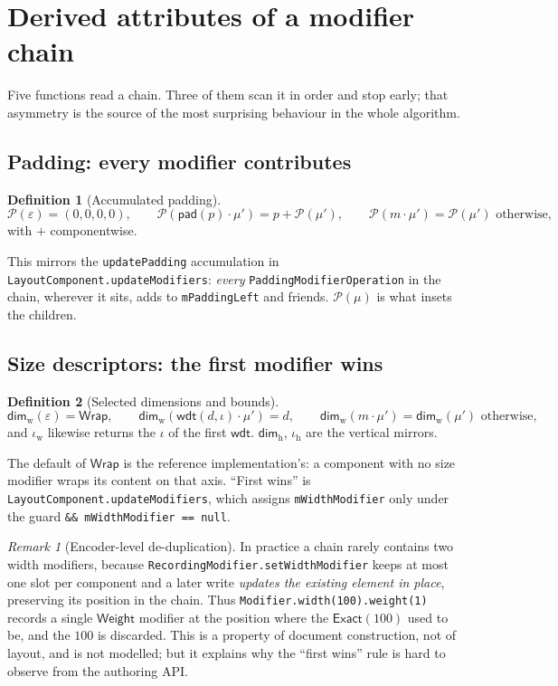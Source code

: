 \documentclass[11pt,a4paper]{article}
\newcommand{\Exact}{\mathsf{Exact}}
\newcommand{\Wrap}{\mathsf{Wrap}}
\newcommand{\Weight}{\mathsf{Weight}}
\newcommand{\pad}{\mathsf{pad}}
\newcommand{\wdt}{\mathsf{wdt}}
\newcommand{\Pp}{\mathcal{P}}          %
\newcommand{\Iw}{\iota_{\mathrm{w}}}
\newcommand{\Ih}{\iota_{\mathrm{h}}}
\newcommand{\Dimw}{\mathsf{dim}_{\mathrm{w}}}
\newcommand{\Dimh}{\mathsf{dim}_{\mathrm{h}}}
\newcommand{\jv}[1]{\texttt{#1}}       %
\theoremstyle{definition}
\newtheorem{definition}{Definition}[section]
\theoremstyle{plain}
\theoremstyle{remark}
\newtheorem*{remark}{Remark}
\begin{document}
\section{Derived attributes of a modifier chain}
\label{sec:derived}

Five functions read a chain. Three of them scan it in order and stop early;
that asymmetry is the source of the most surprising behaviour in the whole
algorithm.

\subsection{Padding: every modifier contributes}

\begin{definition}[Accumulated padding]
\[
  \Pp(\varepsilon) = (0,0,0,0), \qquad
  \Pp(\pad(p)\cdot\mu') = p + \Pp(\mu'), \qquad
  \Pp(m\cdot\mu') = \Pp(\mu') \text{ otherwise,}
\]
with $+$ componentwise.
\end{definition}

This mirrors the \jv{updatePadding} accumulation in
\jv{LayoutComponent.updateModifiers}: \emph{every} \jv{PaddingModifierOperation}
in the chain, wherever it sits, adds to \jv{mPaddingLeft} and friends. $\Pp(\mu)$
is what insets the children.

\subsection{Size descriptors: the first modifier wins}

\begin{definition}[Selected dimensions and bounds]
\[
  \Dimw(\varepsilon) = \Wrap, \qquad
  \Dimw(\wdt(d,\iota)\cdot\mu') = d, \qquad
  \Dimw(m\cdot\mu') = \Dimw(\mu') \text{ otherwise,}
\]
and $\Iw$ likewise returns the $\iota$ of the first $\wdt$. $\Dimh$, $\Ih$ are
the vertical mirrors.
\end{definition}

The default of $\Wrap$ is the reference implementation's: a component with no
size modifier wraps its content on that axis. ``First wins'' is
\jv{LayoutComponent.updateModifiers}, which assigns \jv{mWidthModifier} only
under the guard \jv{\&\& mWidthModifier == null}.

\begin{remark}[Encoder-level de-duplication]
In practice a chain rarely contains two width modifiers, because
\jv{RecordingModifier.setWidthModifier} keeps at most one slot per component and
a later write \emph{updates the existing element in place}, preserving its
position in the chain. Thus \jv{Modifier.width(100).weight(1)} records a single
$\Weight$ modifier at the position where the $\Exact(100)$ used to be, and the
$100$ is discarded. This is a property of document construction, not of layout,
and is not modelled; but it explains why the ``first wins'' rule is hard to
observe from the authoring API.
\end{remark}
\end{document}
